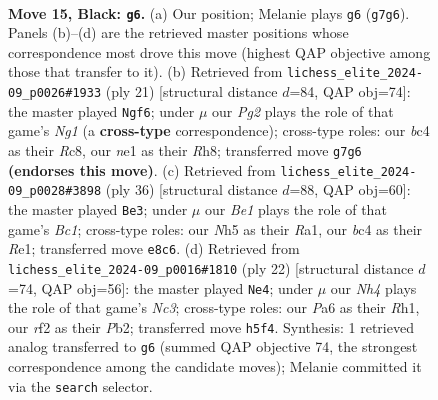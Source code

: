 \documentclass[11pt]{article}
\begin{document}
\begin{figure}[p]
\label{fig:thought-m27}
\end{figure}

\clearpage

\begin{figure}[p]\centering
\begin{subfigure}{0.46\textwidth}\centering
\resizebox{\linewidth}{!}{%
\newchessgame
\chessboard[
  setfen={rn2bbr1/1p2k1pp/p3p3/2P2p1n/P1B5/2N1PP2/1P3RPP/R1B1N1K1 b - - 1 15},
  showmover=false,
  pgfstyle=straightmove, color=movearrow, markmove={g7-g6}
]}
\caption{}
\end{subfigure}\hfill
\begin{subfigure}{0.46\textwidth}\centering
\resizebox{\linewidth}{!}{%
\newchessgame
\chessboard[
  setfen={2r1kbnr/1p1n1ppp/p3p3/2Pp1b2/3P4/2N2N2/1P2PPPP/R1B1KB1R b KQk - 2 11},
  showmover=false,
  pgfstyle=straightmove, color=movearrow, markmove={g8-f6}
]}
\caption{}
\end{subfigure}
\\[4pt]
\begin{subfigure}{0.46\textwidth}\centering
\resizebox{\linewidth}{!}{%
\newchessgame
\chessboard[
  setfen={1r2rbk1/pp3pp1/2n4p/2pnp3/P7/2PP1NNP/1P3PP1/R1B1R1K1 w - - 0 19},
  showmover=false,
  pgfstyle=straightmove, color=movearrow, markmove={c1-e3}
]}
\caption{}
\end{subfigure}\hfill
\begin{subfigure}{0.46\textwidth}\centering
\resizebox{\linewidth}{!}{%
\newchessgame
\chessboard[
  setfen={r1b2rk1/ppnpppbp/2n3p1/2P1P3/5B2/2N2N1P/PPP2PP1/R3KB1R w KQ - 1 12},
  showmover=false,
  pgfstyle=straightmove, color=movearrow, markmove={c3-e4}
]}
\caption{}
\end{subfigure}
\caption{\textbf{Move 15, Black: \texttt{g6}.} (a) Our position; Melanie plays \texttt{g6} (\texttt{g7g6}). Panels (b)--(d) are the retrieved master positions whose correspondence most drove this move (highest QAP objective among those that transfer to it). (b) Retrieved from \texttt{lichess\_elite\_2024-09\_p0026\#1933} (ply 21) [structural distance $d$=84, QAP obj=74]: the master played \texttt{Ngf6}; under $\mu$ our \emph{Pg2} plays the role of that game's \emph{Ng1} (a \textbf{cross-type} correspondence); cross-type roles: our \emph{b}c4 as their \emph{R}c8, our \emph{n}e1 as their \emph{R}h8; transferred move \texttt{g7g6} \textbf{(endorses this move)}. (c) Retrieved from \texttt{lichess\_elite\_2024-09\_p0028\#3898} (ply 36) [structural distance $d$=88, QAP obj=60]: the master played \texttt{Be3}; under $\mu$ our \emph{Be1} plays the role of that game's \emph{Bc1}; cross-type roles: our \emph{N}h5 as their \emph{R}a1, our \emph{b}c4 as their \emph{R}e1; transferred move \texttt{e8c6}. (d) Retrieved from \texttt{lichess\_elite\_2024-09\_p0016\#1810} (ply 22) [structural distance $d$=74, QAP obj=56]: the master played \texttt{Ne4}; under $\mu$ our \emph{Nh4} plays the role of that game's \emph{Nc3}; cross-type roles: our \emph{P}a6 as their \emph{R}h1, our \emph{r}f2 as their \emph{P}b2; transferred move \texttt{h5f4}. Synthesis: 1 retrieved analog transferred to \texttt{g6} (summed QAP objective 74, the strongest correspondence among the candidate moves); Melanie committed it via the \texttt{search} selector.}

\end{figure}
\end{document}
